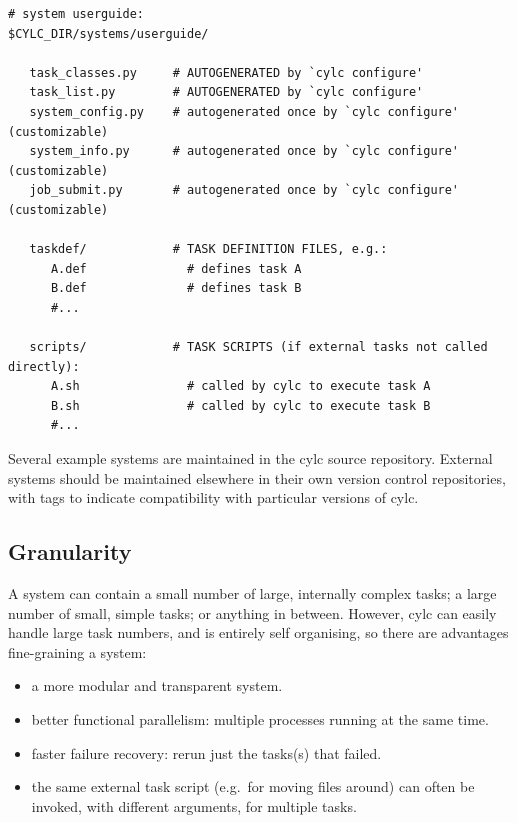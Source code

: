 \documentclass[11pt,a4paper]{article}
\begin{document}
\begin{lstlisting}
# system userguide:
$CYLC_DIR/systems/userguide/

   task_classes.py     # AUTOGENERATED by `cylc configure' 
   task_list.py        # AUTOGENERATED by `cylc configure' 
   system_config.py    # autogenerated once by `cylc configure' (customizable)
   system_info.py      # autogenerated once by `cylc configure' (customizable)
   job_submit.py       # autogenerated once by `cylc configure' (customizable)

   taskdef/            # TASK DEFINITION FILES, e.g.:
      A.def              # defines task A
      B.def              # defines task B
      #...

   scripts/            # TASK SCRIPTS (if external tasks not called directly):
      A.sh               # called by cylc to execute task A
      B.sh               # called by cylc to execute task B
      #...
\end{lstlisting}

Several example systems are maintained in the cylc source repository.
External systems should be maintained elsewhere in their own version
control repositories, with tags to indicate compatibility with
particular versions of cylc.

\subsection{Granularity} 
\label{Granularity}

A system can contain a small number of large, internally complex tasks;
a large number of small, simple tasks; or anything in between. However,
cylc can easily handle large task numbers, and is entirely self
organising, so there are advantages fine-graining a system:

\begin{itemize}
    \item a more modular and transparent system.

    \item better functional parallelism: multiple processes running
        at the same time.

    \item faster failure recovery: rerun just the tasks(s) that failed. 

    \item the same external task script (e.g.\ for moving files around)
        can often be invoked, with different arguments, for multiple
        tasks.

\end{itemize}
\end{document}
